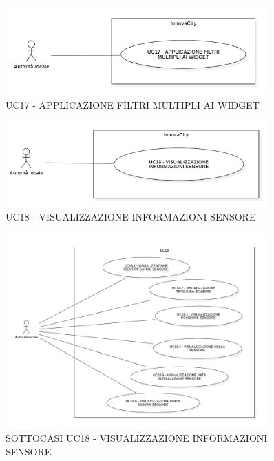
\begin{figure}[H]
    \centering
    \includegraphics[width=0.9\textwidth]{../Images/uc17.PNG}
    \caption{UC17 - APPLICAZIONE FILTRI MULTIPLI AI WIDGET}
    \label{fig:UC7}
\end{figure}

\begin{figure}[H]
    \centering
    \includegraphics[width=0.9\textwidth]{../Images/uc18.PNG}
    \caption{UC18 - VISUALIZZAZIONE INFORMAZIONI SENSORE}
    \label{fig:UC7}
\end{figure}



\begin{figure}[H]
    \centering
    \includegraphics[width=0.9\textwidth]{../Images/uc18sub.PNG}
    \caption{SOTTOCASI UC18 - VISUALIZZAZIONE INFORMAZIONI SENSORE}
    \label{fig:UC7}
\end{figure}








